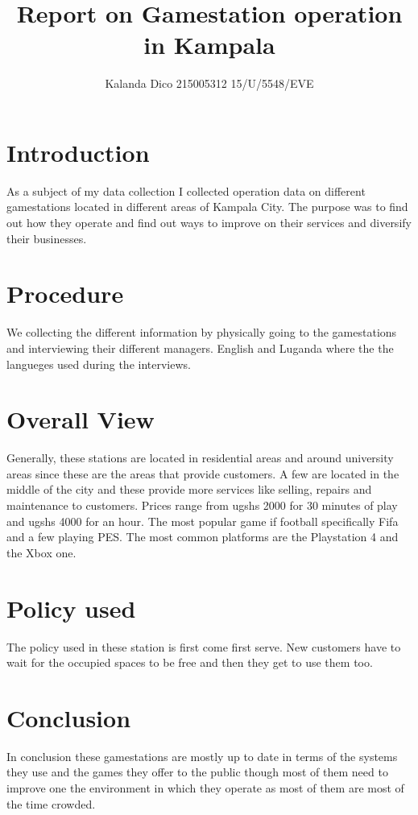 \documentclass{article}
\begin{document}
\title{Report on Gamestation operation in Kampala}
\author{Kalanda Dico 215005312  15/U/5548/EVE}
\maketitle{}

\section{Introduction}
As a subject of my data collection I collected operation data on different gamestations located in different areas of Kampala City. The purpose was to find out how they operate and find out ways to improve on their services and diversify their businesses.

\section{Procedure}
We collecting the different information by physically going to the gamestations and interviewing their different managers. English and Luganda where the the langueges used during the interviews.

\section{Overall View}
Generally, these stations are located in residential areas and around university areas since these are the areas that provide customers. A few are located in the middle of the city and these provide more services like selling, repairs and maintenance to customers. Prices range from ugshs 2000 for 30 minutes of play and ugshs 4000 for an hour. The most popular game if football specifically Fifa and a few playing PES. The most common platforms are the Playstation 4 and the Xbox one.

\section{Policy used}
The policy used in these station is first come first serve. New customers have to wait for the occupied spaces to be free and then they get to use them too.

\section{Conclusion}
In conclusion these gamestations are mostly up to date in terms of the systems they use and the games they offer to the public though most of them need to improve one the environment in which they operate as most of them are most of the time crowded.
\end{document}
